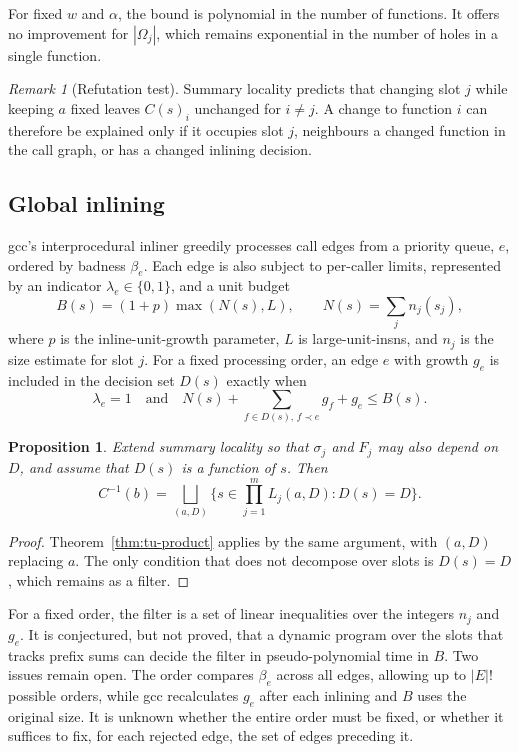 \documentclass[11pt]{article}
\newtheorem{proposition}[theorem]{Proposition}
\theoremstyle{definition}
\theoremstyle{remark}
\newtheorem{remark}[theorem]{Remark}
\begin{document}
For fixed $w$ and $\alpha$, the bound is polynomial in the number of functions. It offers no improvement for $|\Omega_j|$, which remains exponential in the number of holes in a single function.

\begin{remark}[Refutation test]
Summary locality predicts that changing slot $j$ while keeping $a$ fixed leaves $C(s)_i$ unchanged for $i \neq j$. A change to function $i$ can therefore be explained only if it occupies slot $j$, neighbours a changed function in the call graph, or has a changed inlining decision.
\end{remark}

\subsection{Global inlining}

gcc's interprocedural inliner greedily processes call edges from a priority queue, $e$, ordered by badness $\beta_e$. Each edge is also subject to per-caller limits, represented by an indicator $\lambda_e \in \{0, 1\}$, and a unit budget
\[
  B(s) = (1 + p) \max(N(s), L), \qquad N(s) = \sum_j n_j(s_j),
\]
where $p$ is the inline-unit-growth parameter, $L$ is large-unit-insns, and $n_j$ is the size estimate for slot $j$. For a fixed processing order, an edge $e$ with growth $g_e$ is included in the decision set $D(s)$ exactly when
\[
  \lambda_e = 1 \quad \text{and} \quad N(s) + \sum_{f \in D(s),\, f \prec e} g_f + g_e \le B(s).
\]

\begin{proposition}
Extend summary locality so that $\sigma_j$ and $F_j$ may also depend on $D$, and assume that $D(s)$ is a function of $s$. Then
\[
  C^{-1}(b) = \bigsqcup_{(a, D)} \Big\{ s \in \prod_{j=1}^m L_j(a, D) : D(s) = D \Big\}.
\]
\end{proposition}

\begin{proof}
Theorem~\ref{thm:tu-product} applies by the same argument, with $(a, D)$ replacing $a$. The only condition that does not decompose over slots is $D(s) = D$, which remains as a filter.
\end{proof}

For a fixed order, the filter is a set of linear inequalities over the integers $n_j$ and $g_e$. It is conjectured, but not proved, that a dynamic program over the slots that tracks prefix sums can decide the filter in pseudo-polynomial time in $B$. Two issues remain open. The order compares $\beta_e$ across all edges, allowing up to $|E|!$ possible orders, while gcc recalculates $g_e$ after each inlining and $B$ uses the original size. It is unknown whether the entire order must be fixed, or whether it suffices to fix, for each rejected edge, the set of edges preceding it.
\end{document}
